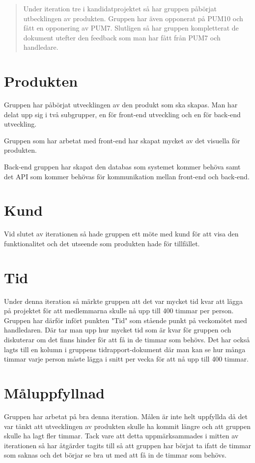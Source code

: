 \documentclass[a4paper,10pt]{article}
\begin{document}


\clearpage
\begin{abstract}
\noindent Under iteration tre i kandidatprojektet så har gruppen påbörjat utbecklingen av produkten. Gruppen har även opponerat på PUM10 och fått en opponering av PUM7.
Slutligen så har gruppen kompletterat de dokument utefter den feedback som man har fått från PUM7 och handledare.
\end{abstract}
\clearpage

\section{Produkten}
\label{sec:Produkten}
Gruppen har påbörjat utvecklingen av den produkt som ska skapas. Man har delat upp sig i två subgrupper, en för front-end utveckling och en för back-end utveckling.

Gruppen som har arbetat med front-end har skapat mycket av det visuella för produkten. 

Back-end gruppen har skapat den databas som systemet kommer behöva samt det API som kommer behövas för kommunikation mellan front-end och back-end.

\section{Kund}
Vid slutet av iterationen så hade gruppen ett möte med kund för att visa den funktionalitet och det utseende som produkten hade för tillfället. 

\section{Tid}
Under denna iteration så märkte gruppen att det var mycket tid kvar att lägga på projektet för att medlemmarna skulle nå upp till 400 timmar per person. Gruppen har därför infört punkten "Tid" som stående punkt på veckomötet med handledaren. Där tar man upp hur mycket tid som är kvar för gruppen och diskuterar om det finns hinder för att få in de timmar som behövs. 
Det har också lagts till en kolumn i gruppens tidrapport-dokument där man kan se hur många timmar varje person måste lägga i snitt per vecka för att nå upp till 400 timmar.

\section{Måluppfyllnad}
Gruppen har arbetat på bra denna iteration. Målen är inte helt uppfyllda då det var tänkt att utvecklingen av produkten skulle ha kommit längre och att gruppen skulle ha lagt fler timmar. Tack vare att detta uppmärksammades i mitten av iterationen så har åtgärder tagits till så att gruppen har börjat ta ifatt de timmar som saknas och det börjar se bra ut med att få in de timmar som behövs.
\end{document}
